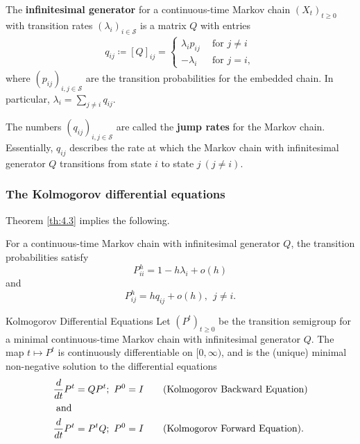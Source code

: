 \begin{defn}{}{}
The \textbf{infinitesimal generator } for a continuous-time Markov chain \((X_{t} )_{t \geq 0}\) with transition rates \((\lambda _{i} )_{i \in  \mathcal{S} } \) is a matrix \(Q\) with entries 
\begin{align*}
    q_{ij}\coloneqq [Q]_{ij} = \begin{cases}
        \lambda _{i} p_{ij} \ \ &\text{for  } j\neq i\\
        -\lambda  _{i}  \ \ &\text{for } j = i, 
    \end{cases}
\end{align*}
where \((p_{ij} )_{i,j \in \mathcal{S} }\) are the transition probabilities for the embedded chain. In particular, \(\lambda _{i} = \sum_{j\neq i}q_{ij}  \). 

The numbers \((q_{ij} )_{i,j \in \mathcal{S} }\) are called the \textbf{jump rates } for the Markov chain. Essentially, \(q_{ij} \) describes the rate at which the Markov chain with infinitesimal generator \(Q\) transitions from state \(i\) to state \(j \ (j\neq i)\). 
\end{defn}


\subsubsection{The Kolmogorov differential equations}

\begin{cor}{}{}
    Theorem \ref{th:4.3} implies the following.

    For a continuous-time Markov chain with infinitesimal generator \(Q\), the transition probabilities satisfy
    \[
        P_{i i }^h = 1 - h \lambda _{i} + o(h)
    \]
    and 
    \[
        P_{ij}^h = hq_{ij}+ o(h), \ \ j \neq i.   
    \]


\end{cor}


\begin{thrm}{Kolmogorov Differential Equations}{}
Let \((P^t)_{t \geq 0}\) be the transition semigroup for a minimal continuous-time Markov chain with infinitesimal generator \(Q\). The map \(t \mapsto P^t\)  is continuously differentiable on \([0, \infty )\), and is the (unique) minimal non-negative solution to the differential equations
\begin{align*}
    \frac{d}{dt} P^t &=  QP^t; \ P^0 = I \tag{\text{Kolmogorov Backward Equation}} \\ 
    \text{ and } \\
    \frac{d}{dt} P^t &= P^{t}Q; \ P^0 = I\tag{\text{Kolmogorov Forward Equation}} .
\end{align*}

\end{thrm}

